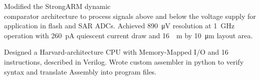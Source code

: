 \documentclass{cv}  %
\begin{document}
\begin{paracol}{2}
\divider

\parbox[t]{0.25 \textwidth}{\large{}}
\hfill
\parbox[t]{0.6 \linewidth}{\vspace{-11pt} Modified the StrongARM dynamic \\ comparator architecture to process signals above and below the voltage supply for \\ application in flash and SAR ADCs. Achieved \qty{890}{\uV} resolution at \qty{1}{\GHz} operation with \qty{260}{\pA} quiescent current draw and \qty{16}{\textmu m} by \qty{10}{\um} layout area.}
\hspace{0pt}
\vspace{-6pt}

\divider

\parbox[t]{0.25 \textwidth}{\large{}}
\hfill
\parbox[t]{0.6 \linewidth}{\vspace{-11pt} Designed a Harvard-architecture CPU with Memory-Mapped I/O and 16 instructions, described in Verilog. Wrote custom assembler in python to verify syntax and translate Assembly into program files.}
\hspace{0pt}
\vspace{-12pt}

\end{paracol}
\end{document}
